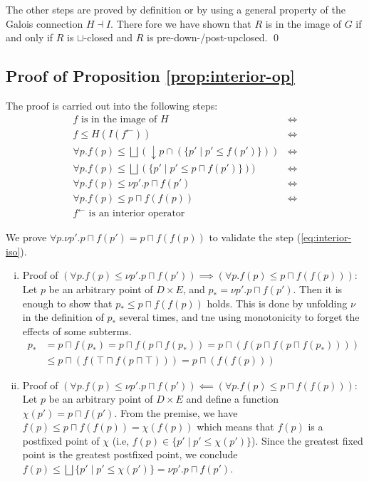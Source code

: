 \documentclass{llncs}
\newcommand{\fb}{{f^{\leftarrow}}}
\newcommand{\join}{\sqcup}
\newcommand{\bigjoin}{\bigsqcup}
\newcommand{\meet}{\sqcap}
\begin{document}
The other steps are proved by definition or by using a general property of the Galois connection $H \dashv I$.
There fore we have shown that $R$ is in the image of $G$ if and only if $R$ is $\join$-closed and $R$ is pre-down-/post-upclosed.
\qed

\subsection{Proof of Proposition \ref{prop:interior-op}}
The proof is carried out into the following steps:
\begin{align*}
 f \text{ is in the image of } H &\iff \\
 f \leq H(I(\fb)) &\iff \\
 \forall p. f(p) \leq \bigjoin (\downarrow p \cap (\{p' \mid p' \leq f(p') \})) &\iff \\
 \forall p. f(p) \leq \bigjoin (\{p' \mid p' \leq  p \meet f(p') \})) &\iff \\
  \forall p. f(p) \leq \nu p' . p \meet f(p') &\iff \tag{*}\label{eq:interior-iso}\\
 \forall p. f(p) \leq p \meet f(f(p)) &\iff \\
 \fb \text{ is an interior operator}
\end{align*}

We prove $\forall p.\nu p' . p \sqcap f(p') = p \sqcap f(f(p))$ to validate the step (\ref{eq:interior-iso}).

\begin{enumerate}[i.]
\item{Proof of $(\forall p. f(p) \leq \nu p' . p \sqcap f(p')) \implies (\forall p. f(p) \leq p \meet f(f(p)))$:}\\
Let $p$ be an arbitrary point of $D \times E$, and $p_{*} = \nu p' . p \meet f(p')$.
Then it is enough to show that $p_{*} \leq p \meet f(f(p))$ holds. This is done by unfolding $\nu$ in the definition of $p_{*}$ several times, and tne using monotonicity to forget the effects of some subterms.
\begin{align*}
p_{*} & = p \meet f(p_{*}) = p \meet f(p \meet f(p_{*})) = p \meet (f (p \meet f(p \meet f(p_{*})))) \\
     & \leq p \meet (f (\top \meet f(p \meet \top))) = p \meet (f (f (p)))
\end{align*}
\item{Proof of $(\forall p. f(p) \leq \nu p' . p \meet f(p')) \impliedby (\forall p. f(p) \leq p \meet f(f(p)))$:}\\

Let $p$ be an arbitrary point of $D \times E$ and define a function $\chi(p') = p \meet f(p')$.
From the premise, we have $f(p) \leq p \meet f (f (p)) = \chi (f(p))$ which means that $f(p)$ is a postfixed point of $\chi$ (i.e, $f(p) \in \{ p' \mid p' \leq \chi(p') \}$). Since the greatest fixed point is the greatest postfixed point, we conclude $f(p) \leq \bigjoin \{ p' \mid p' \leq \chi(p') \} = \nu p' . p \meet f(p') $.
\end{enumerate}
\end{document}
